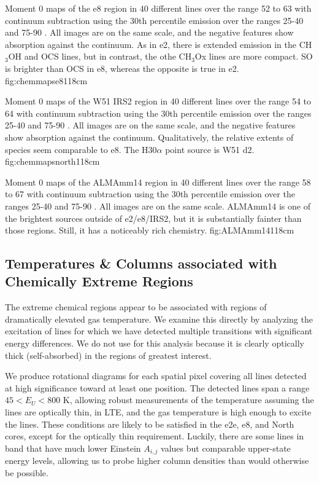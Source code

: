 \documentclass{aa}
\begin{document}
{Moment 0 maps of the e8 region in 40 different lines over the range 52 to 63
\kms with continuum subtraction using the 30th percentile emission
over the ranges 25-40 and 75-90 \kms.  All images are on the same scale, and
the negative features show absorption against the continuum.  As in e2,
there is extended emission in the CH$_3$OH and OCS lines, but in contrast,
the othe CH$_3$Ox lines are more compact. SO is brighter than OCS in e8, 
whereas the opposite is true in e2.
}{fig:chemmapse8}{1}{18cm}

{Moment 0 maps of the W51 IRS2 region in 40 different lines over the range 54 to 64
\kms with continuum subtraction using the 30th percentile emission
over the ranges 25-40 and 75-90 \kms.  All images are on the same scale, and
the negative features show absorption against the continuum.  Qualitatively,
 the relative extents of species seem comparable to e8.  The H30$\alpha$ 
 point source is W51 d2.
}{fig:chemmapsnorth}{1}{18cm}

{Moment 0 maps of the ALMAmm14 region in 40 different lines over the range 58 to 67
\kms with continuum subtraction using the 30th percentile emission
over the ranges 25-40 and 75-90 \kms.  All images are on the same scale. 
ALMAmm14 is one of the brightest sources outside of e2/e8/IRS2, but
it is substantially fainter than those regions.  Still, it has a noticeably
rich chemistry.
}{fig:ALMAmm14}{1}{18cm}

\subsection{Temperatures \& Columns associated with Chemically Extreme Regions}
The extreme chemical regions appear to be associated with regions of
dramatically elevated gas temperature.  We examine this directly by analyzing
the excitation of lines for which we have detected multiple transitions with
significant energy differences.  We do not use \formaldehyde for this analysis
because it is clearly optically thick (self-absorbed) in the regions of
greatest interest.

We produce rotational diagrams for each spatial pixel covering all \methanol lines
detected at high significance toward at least one position.  The detected lines
span a range $45 < E_U < 800$ K, allowing robust measurements of the temperature
assuming the lines are optically thin, in LTE, and the gas temperature is high
enough to excite the lines.  These conditions are likely to be satisfied in the
e2e, e8, and North cores, except for the optically thin requirement.  Luckily,
there are some lines in band that have much lower Einstein $A_{i,j}$ values
but comparable upper-state energy levels, allowing us to probe higher column
densities than would otherwise be possible.
\end{document}
